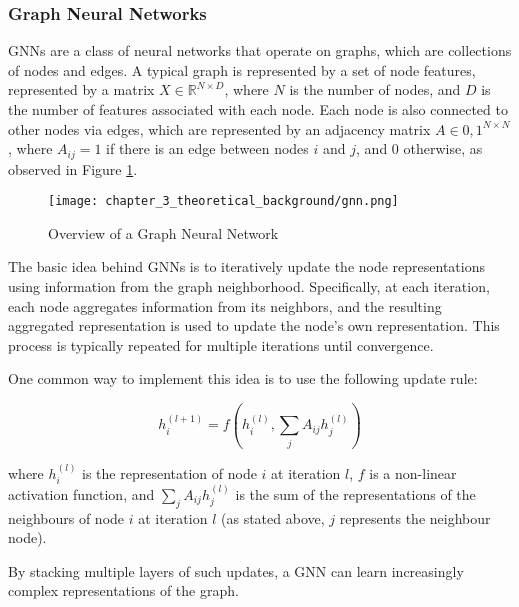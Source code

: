 \subsubsection{Graph Neural Networks}
\label{subsubsec:3_gnns}

GNNs are a class of neural networks that operate on graphs, which are collections of nodes and edges. A typical graph is represented by a set of node features, represented by a matrix $X \in \mathbb{R}^{N \times D}$, where $N$ is the number of nodes, and $D$ is the number of features associated with each node. Each node is also connected to other nodes via edges, which are represented by an adjacency matrix $A \in {0,1}^{N \times N}$, where $A_{ij} = 1$ if there is an edge between nodes $i$ and $j$, and $0$ otherwise, as observed in Figure \ref{fig:chapter_3_theoretical_background/gnn}.

\begin{figure}[h]
	\centering
	\texttt{[image: chapter\_3\_theoretical\_background/gnn.png]}
	\caption{Overview of a Graph Neural Network}
	\label{fig:chapter_3_theoretical_background/gnn}
\end{figure}

The basic idea behind GNNs is to iteratively update the node representations using information from the graph neighborhood. Specifically, at each iteration, each node aggregates information from its neighbors, and the resulting aggregated representation is used to update the node's own representation. This process is typically repeated for multiple iterations until convergence. %

One common way to implement this idea is to use the following update rule:

\begin{equation}
h_i^{(l+1)} = f(h_i^{(l)}, \sum_{j} A_{ij} h_j^{(l)})
\end{equation}

where $h_i^{(l)}$ is the representation of node $i$ at iteration $l$, $f$ is a non-linear activation function, and $\sum_{j} A_{ij} h_j^{(l)}$ is the sum of the representations of the neighbours of node $i$ at iteration $l$ (as stated above, $j$ represents the neighbour node).

By stacking multiple layers of such updates, a GNN can learn increasingly complex representations of the graph.

